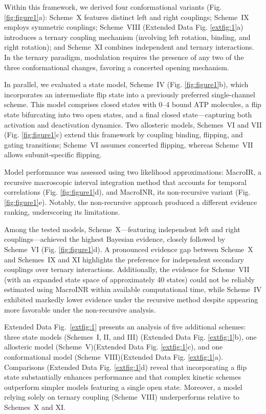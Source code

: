 \documentclass[pdflatex,sn-mathphys-num]{sn-jnl}%
\theoremstyle{thmstyleone}%
\theoremstyle{thmstyletwo}%
\theoremstyle{thmstylethree}%
\begin{document}
Within this framework, we derived four conformational variants (Fig. \ref{fig:figure1}a): Scheme~X features distinct left and right couplings; Scheme~IX employs symmetric couplings; Scheme~VIII (Extended Data Fig. \ref{extfig:1}a) introduces a ternary coupling mechanism (involving left rotation, binding, and right rotation); and Scheme~XI combines independent and ternary interactions. In the ternary paradigm, modulation requires the presence of any two of the three conformational changes, favoring a concerted opening mechanism.

In parallel, we evaluated a state model, Scheme~IV (Fig. \ref{fig:figure1}b), which incorporates an intermediate flip state into a previously preferred single-channel scheme. This model comprises closed states with 0–4 bound ATP molecules, a flip state bifurcating into two open states, and a final closed state—capturing both activation and deactivation dynamics. Two allosteric models, Schemes~VI and VII (Fig. \ref{fig:figure1}c) extend this framework by coupling binding, flipping, and gating transitions; Scheme~VI assumes concerted flipping, whereas Scheme~VII allows subunit-specific flipping.

Model performance was assessed using two likelihood approximations: MacroIR, a recursive macroscopic interval integration method that accounts for temporal correlations (Fig. \ref{fig:figure1}d), and MacroINR, its non-recursive variant (Fig. \ref{fig:figure1}e). Notably, the non-recursive approach produced a different evidence ranking, underscoring its limitations.

Among the tested models, Scheme~X—featuring independent left and right couplings—achieved the highest Bayesian evidence, closely followed by Scheme~VI (Fig. \ref{fig:figure1}d). A pronounced evidence gap between Scheme~X and Schemes~IX and XI highlights the preference for independent secondary couplings over ternary interactions. Additionally, the evidence for Scheme~VII (with an expanded state space of approximately 40 states) could not be reliably estimated using MacroINR within available computational time, while Scheme~IV exhibited markedly lower evidence under the recursive method despite appearing more favorable under the non-recursive analysis.

Extended Data Fig.~\ref{extfig:1} presents an analysis of five additional schemes: three state models (Schemes~I, II, and III) (Extended Data Fig. \ref{extfig:1}b), one allosteric model (Scheme~V)(Extended Data Fig. \ref{extfig:1}c), and one conformational model (Scheme~VIII)(Extended Data Fig. \ref{extfig:1}a). Comparisons (Extended Data Fig. \ref{extfig:1}d) reveal that incorporating a flip state substantially enhances performance and that complex kinetic schemes outperform simpler models featuring a single open state. Moreover, a model relying solely on ternary coupling (Scheme~VIII) underperforms relative to Schemes~X and XI.
\end{document}
